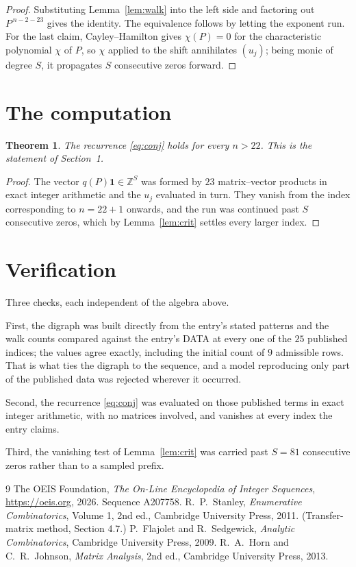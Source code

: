 \documentclass[11pt,a4paper]{article}
\theoremstyle{plain}
\newtheorem{theorem}{Theorem}
\theoremstyle{definition}
\begin{document}
\begin{proof}
Substituting Lemma~\ref{lem:walk} into the left side and factoring out
$P^{\,n-2-23}$ gives the identity. The equivalence follows by letting the exponent
run. For the last claim, Cayley--Hamilton gives $\chi(P)=0$ for the characteristic
polynomial $\chi$ of $P$, so $\chi$ applied to the shift annihilates $(u_j)$; being monic of
degree $S$, it propagates $S$ consecutive zeros forward.
\end{proof}

\section{The computation}

\begin{theorem}
The recurrence \eqref{eq:conj} holds for every $n>22$. This is the statement of
Section~1.
\end{theorem}

\begin{proof}
The vector $q(P)\mathbf{1}\in\mathbb{Z}^{S}$ was formed by $23$ matrix--vector
products in exact integer arithmetic and the $u_j$ evaluated in turn. They vanish from the
index corresponding to $n=22+1$ onwards, and the run was continued past $S$ consecutive
zeros, which by Lemma~\ref{lem:crit} settles every larger index.
\end{proof}

\section{Verification}

Three checks, each independent of the algebra above.

First, the digraph was built directly from the entry's stated patterns and the walk counts
compared against the entry's DATA at every one of the $25$ published indices; the
values agree exactly, including the initial count of $9$ admissible rows. That is
what ties the digraph to the sequence, and a model reproducing only part of the published
data was rejected wherever it occurred.

Second, the recurrence \eqref{eq:conj} was evaluated on those published terms in exact
integer arithmetic, with no matrices involved, and vanishes at every index the entry claims.

Third, the vanishing test of Lemma~\ref{lem:crit} was carried past $S=81$ consecutive
zeros rather than to a sampled prefix.

\begin{thebibliography}{9}
 The OEIS Foundation, \emph{The On-Line Encyclopedia of Integer
Sequences}, \url{https://oeis.org}, 2026. Sequence A207758.
 R.~P.~Stanley, \emph{Enumerative Combinatorics}, Volume 1, 2nd ed.,
Cambridge University Press, 2011. (Transfer-matrix method, Section 4.7.)
 P.~Flajolet and R.~Sedgewick, \emph{Analytic Combinatorics}, Cambridge
University Press, 2009.
 R.~A.~Horn and C.~R.~Johnson, \emph{Matrix Analysis}, 2nd ed., Cambridge
University Press, 2013.
\end{thebibliography}
\end{document}
